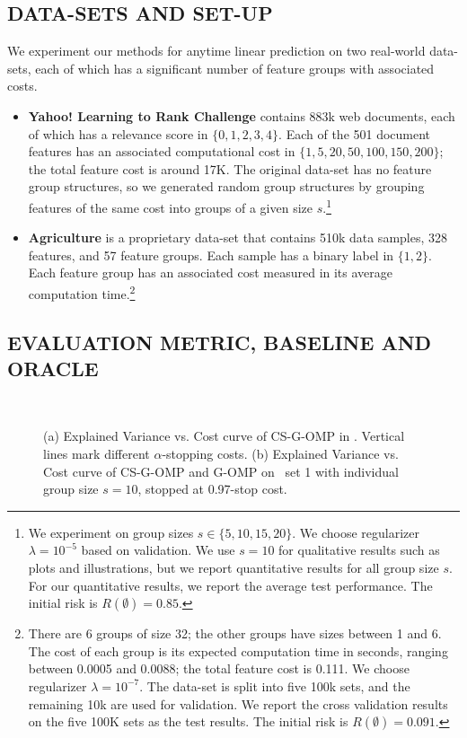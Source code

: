 \subsection{DATA-SETS AND SET-UP}
We experiment our methods for anytime linear prediction on two real-world data-sets,
each of which has a significant number of feature groups with associated costs. 

\begin{itemize}[leftmargin=*]
\item \textbf{Yahoo! Learning to Rank Challenge} \citep{yahoo_ltr}
contains 883k web documents, each of which has a relevance score in $\{0, 1, 2, 3, 4\}$. Each of the 501 document features has an associated computational cost in 
$\{ 1, 5, 20, 50, 100, 150, 200\}$; the total feature cost is around 17K. The original data-set has no feature group structures, so we generated random group structures by grouping features of the same cost into groups of a given size $s$.\footnote{We experiment on group sizes $s \in \{ 5, 10, 15, 20 \}$. We choose regularizer 
$\lambda = 10^{-5}$ based on validation. We use 
$s=10$ for qualitative results such as plots and illustrations, but we report quantitative results for all group size $s$. For our quantitative results, we report the average test performance. The initial risk is $R(\emptyset)=0.85$.}

\item \textbf{Agriculture} is a proprietary data-set that contains 510k data samples, 328 features, and 57 feature groups. Each sample has a binary label in $\{1, 2\}$. Each feature group has an associated cost measured in its 
average computation time.\footnote{
There are 6 groups of size 32; the other groups have sizes between 1 and 6. 
The cost of each group is its expected computation time in seconds, ranging between 0.0005 and 0.0088; the total feature cost is 0.111. 
We choose regularizer $\lambda = 10^{-7}$. The data-set is 
split into five 100k sets, and the remaining 10k are used for validation. We report the cross validation results on the five 100K sets as the test results. The initial risk is $R(\emptyset) = 0.091$.}
\end{itemize}

\subsection{EVALUATION METRIC, BASELINE AND ORACLE}
\label{sec:timeliness}
\begin{figure}[ht!]
\centering
{}
~
\label{fig:timeliness}
\caption{(a) Explained Variance vs. Cost curve of CS-G-OMP in
\YahooLTR. Vertical lines mark different $\alpha$-stopping costs.  (b) Explained Variance vs. Cost curve of CS-G-OMP and G-OMP on \YahooLTR\, set 1 with individual group size $s=10$, stopped at 0.97-stop cost.}
\end{figure}

